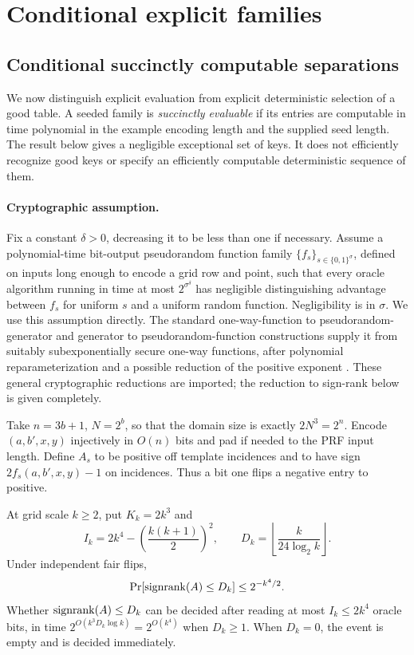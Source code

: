 \section{Conditional explicit families}\label{sec:explicit}
\subsection{Conditional succinctly computable separations}\label{sec:prf}
We now distinguish explicit evaluation from explicit deterministic selection of a good table. A seeded family is \emph{succinctly evaluable} if its entries are computable in time polynomial in the example encoding length and the supplied seed length. The result below gives a negligible exceptional set of keys. It does not efficiently recognize good keys or specify an efficiently computable deterministic sequence of them.

\paragraph{Cryptographic assumption.}
Fix a constant $\delta>0$, decreasing it to be less than one if necessary. Assume a polynomial-time bit-output pseudorandom function family $\{f_s\}_{s\in\{0,1\}^\sigma}$, defined on inputs long enough to encode a grid row and point, such that every oracle algorithm running in time at most $2^{\sigma^\delta}$ has negligible distinguishing advantage between $f_s$ for uniform $s$ and a uniform random function. Negligibility is in $\sigma$. We use this assumption directly. The standard one-way-function to pseudorandom-generator and generator to pseudorandom-function constructions supply it from suitably subexponentially secure one-way functions, after polynomial reparameterization and a possible reduction of the positive exponent \citep{HILL99,GGM86}. These general cryptographic reductions are imported; the reduction to sign-rank below is given completely.

Take $n=3b+1$, $N=2^b$, so that the domain size is exactly $2N^3=2^n$. Encode $(a,b',x,y)$ injectively in $O(n)$ bits and pad if needed to the PRF input length. Define $A_s$ to be positive off template incidences and to have sign $2f_s(a,b',x,y)-1$ on incidences. Thus a bit one flips a negative entry to positive.


\begin{lemma}\label{lem:subgrid}
At grid scale $k\ge2$, put $K_k=2k^3$ and
\[
 I_k=2k^4-\left(\frac{k(k+1)}2\right)^2,
 \qquad D_k=\left\lfloor\frac{k}{24\log_2 k}\right\rfloor.
\]
Under independent fair flips,
\[
 \Pr[\operatorname{signrank}(A)\le D_k]\le2^{-k^4/2}.
\]
Whether $\operatorname{signrank}(A)\le D_k$ can be decided after reading at most $I_k\le2k^4$ oracle bits, in time $2^{O(k^3D_k\log k)}=2^{O(k^4)}$ when $D_k\ge1$. When $D_k=0$, the event is empty and is decided immediately.
\end{lemma}

